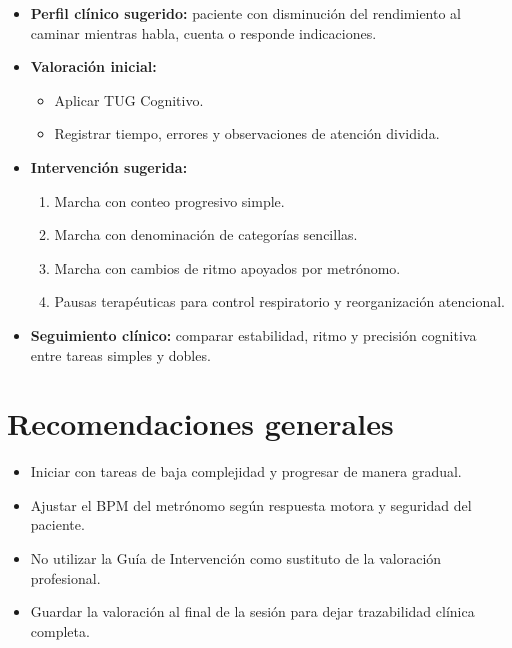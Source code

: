 \documentclass[12pt,a4paper]{article}
\begin{document}
\begin{itemize}
    \item \textbf{Perfil clínico sugerido:} paciente con disminución del rendimiento al caminar mientras habla, cuenta o responde indicaciones.
    \item \textbf{Valoración inicial:}
    \begin{itemize}
        \item Aplicar TUG Cognitivo.
        \item Registrar tiempo, errores y observaciones de atención dividida.
    \end{itemize}
    \item \textbf{Intervención sugerida:}
    \begin{enumerate}
        \item Marcha con conteo progresivo simple.
        \item Marcha con denominación de categorías sencillas.
        \item Marcha con cambios de ritmo apoyados por metrónomo.
        \item Pausas terapéuticas para control respiratorio y reorganización atencional.
    \end{enumerate}
    \item \textbf{Seguimiento clínico:} comparar estabilidad, ritmo y precisión cognitiva entre tareas simples y dobles.
\end{itemize}

\section{Recomendaciones generales}

\begin{itemize}
    \item Iniciar con tareas de baja complejidad y progresar de manera gradual.
    \item Ajustar el BPM del metrónomo según respuesta motora y seguridad del paciente.
    \item No utilizar la Guía de Intervención como sustituto de la valoración profesional.
    \item Guardar la valoración al final de la sesión para dejar trazabilidad clínica completa.
\end{itemize}
\end{document}
